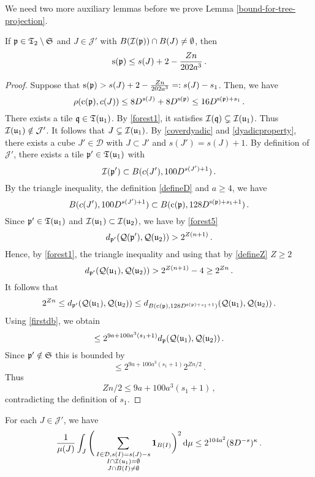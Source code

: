 {    We need two more auxiliary lemmas before we prove Lemma \ref{bound-for-tree-projection}.

    \begin{lemma}
        \label{thin-scale-impact}
        If ${\mathfrak p} \in {\mathfrak T}_2 \setminus \mathfrak{S}$ and $J \in \mathcal{J'}$ with $B({\mathcal{I}}({\mathfrak p})) \cap B(J) \ne \emptyset$, then
        $$
            {\mathrm{s}}({\mathfrak p}) \le s(J) + 2 - \frac{Zn}{202a^3}\,.
        $$
    \end{lemma}

    \begin{proof}
        Suppose that ${\mathrm{s}}({\mathfrak p}) > s(J) + 2 -\frac{Zn}{202a^3} =: s(J) - s_1$. Then, we have
        $$
            \rho({\mathrm{c}}({\mathfrak p}), c(J)) \le 8D^{s(J)}+8D^{{\mathrm{s}}({\mathfrak p})} \le 16 D^{{\mathrm{s}}({\mathfrak p}) + s_1}\,.
        $$
        There exists a tile ${\mathfrak q} \in {\mathfrak T}({\mathfrak u}_1)$. By \eqref{forest1}, it satisfies ${\mathcal{I}}({\mathfrak q}) \subsetneq {\mathcal{I}}({\mathfrak u}_1)$. Thus ${\mathcal{I}}({\mathfrak u}_1) \notin \mathcal{J}'$. It follows that $J \subsetneq {\mathcal{I}}({\mathfrak u}_1)$. By \eqref{coverdyadic} and \eqref{dyadicproperty}, there exists a cube $J' \in \mathcal{D}$ with $J \subset J'$ and $s(J') = s(J) + 1$. By definition of $\mathcal{J}'$, there exists a tile ${\mathfrak p}' \in {\mathfrak T}({\mathfrak u}_1)$ with
        $$
            {\mathcal{I}}({\mathfrak p}') \subset B(c(J'), 100 D^{s(J') + 1})\,.
        $$
        By the triangle inequality, the definition \eqref{defineD} and $a \ge 4$, we have
        $$
            B(c(J'), 100 D^{s(J')+1}) \subset B({\mathrm{c}}({\mathfrak p}), 128 D^{{\mathrm{s}}({\mathfrak p}) + s_1 + 1})\,.
        $$
        Since ${\mathfrak p}' \in {\mathfrak T}({\mathfrak u}_1)$ and ${\mathcal{I}}({\mathfrak u}_1) \subset {\mathcal{I}}({\mathfrak u}_2)$, we have by \eqref{forest5}
        $$
            d_{{\mathfrak p}'}({\mathcal{Q}}({\mathfrak p}'), {\mathcal{Q}}({\mathfrak u}_2)) > 2^{Z(n+1)}\,.
        $$
        Hence, by \eqref{forest1}, the triangle inequality and using that by \eqref{defineZ} $Z \ge 2$
        $$
            d_{{\mathfrak p}'}({\mathcal{Q}}({\mathfrak u}_1), {\mathcal{Q}}({\mathfrak u}_2)) > 2^{Z(n+1)} - 4 \ge 2^{Zn}\,.
        $$
        It follows that
        $$
            2^{Zn} \le d_{{\mathfrak p}'}({\mathcal{Q}}({\mathfrak u}_1), {\mathcal{Q}}({\mathfrak u}_2)) \le d_{B({\mathrm{c}}({\mathfrak p}), 128 D^{{\mathrm{s}}({\mathfrak p}) + s_1+ 1})}({\mathcal{Q}}({\mathfrak u}_1), {\mathcal{Q}}({\mathfrak u}_2))\,.
        $$
        Using \eqref{firstdb}, we obtain
        $$
            \le 2^{9a + 100a^3 (s_1+1)} d_{{\mathfrak p}}({\mathcal{Q}}({\mathfrak u}_1), {\mathcal{Q}}({\mathfrak u}_2))\,.
        $$
        Since ${\mathfrak p}' \notin \mathfrak{S}$ this is bounded by
        $$
            \le 2^{9a + 100a^3 (s_1+1)} 2^{Zn/2}\,.
        $$
        Thus
        $$
            Z n/2 \le 9a + 100a^3(s_1 + 1)\,,
        $$
        contradicting the definition of $s_1$.
    \end{proof}

    \begin{lemma}
        \label{square-function-count}
        For each $J \in \mathcal{J}'$, we have
        $$
            \frac{1}{\mu(J)} \int_J \Bigg(\sum_{\substack{I \in \mathcal{D}, s(I) = s(J) - s\\ I \cap {\mathcal{I}}({\mathfrak u}_1) = \emptyset\\
        J \cap B(I) \ne \emptyset}} \mathbf{1}_{B(I)}\bigg)^2 \, \mathrm{d}\mu \le 2^{104a^2} (8 D^{-s})^\kappa\,.
        $$
    \end{lemma}

}
